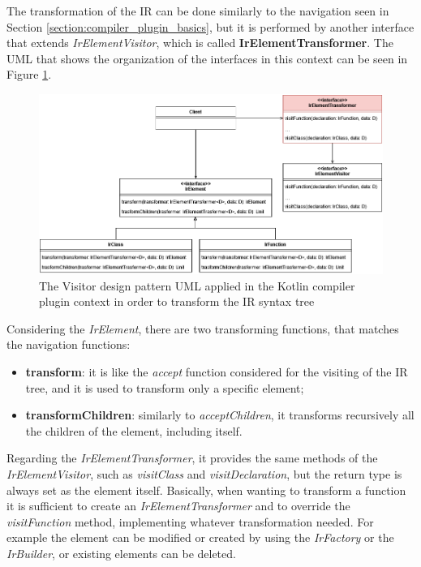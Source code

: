 The transformation of the IR can be done similarly to the navigation seen in Section \ref{section:compiler_plugin_basics}, but it is performed by another interface that extends \textit{IrElementVisitor}, which is called \textbf{IrElementTransformer}. The UML that shows the organization of the interfaces in this context can be seen in Figure \ref{fig:transformer_uml_kotlin_compiler}.\newline
\begin{figure}[!ht]
    \centering
    \includegraphics[scale=0.5]{document/chapters/2-metaprogramming/images/transformer_uml_kotlin_compiler.png}
    \caption{The Visitor design pattern UML applied in the Kotlin compiler plugin context in order to transform the IR syntax tree}
    \label{fig:transformer_uml_kotlin_compiler}
\end{figure}
Considering the \textit{IrElement}, there are two transforming functions, that matches the navigation functions:
\begin{itemize}
    \item \textbf{transform}: it is like the \textit{accept} function considered for the visiting of the IR tree, and it is used to transform only a specific element;
    \item \textbf{transformChildren}: similarly to \textit{acceptChildren}, it transforms recursively all the children of the element, including itself.
\end{itemize}
Regarding the \textit{IrElementTransformer}, it provides the same methods of the \textit{IrElementVisitor}, such as \textit{visitClass} and \textit{visitDeclaration}, but the return type is always set as the element itself. Basically, when wanting to transform a function it is sufficient to create an \textit{IrElementTransformer} and to override the \textit{visitFunction} method, implementing whatever transformation needed. For example the element can be modified  or created by using the \textit{IrFactory} or the \textit{IrBuilder}, or existing elements can be deleted.


